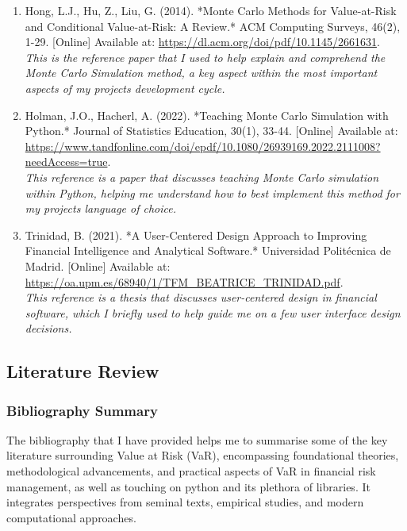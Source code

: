 \documentclass{article}
\begin{document}
\begin{small}
\begin{enumerate}
  \item\label{ref16} Hong, L.J., Hu, Z., Liu, G. (2014). *Monte Carlo Methods for Value-at-Risk and Conditional Value-at-Risk: A Review.* ACM Computing Surveys, 46(2), 1-29. [Online] Available at: \url{https://dl.acm.org/doi/pdf/10.1145/2661631}.
  \\\textit{This is the reference paper that I used to help explain and comprehend the Monte Carlo Simulation method, a key aspect within the most important aspects of my projects development cycle.}

  \item\label{ref17} Holman, J.O., Hacherl, A. (2022). *Teaching Monte Carlo Simulation with Python.* Journal of Statistics Education, 30(1), 33-44. [Online] Available at: \url{https://www.tandfonline.com/doi/epdf/10.1080/26939169.2022.2111008?needAccess=true}.
  \\\textit{This reference is a paper that discusses teaching Monte Carlo simulation within Python, helping me understand how to best implement this method for my projects language of choice.}

  \item\label{ref18} Trinidad, B. (2021). *A User-Centered Design Approach to Improving Financial Intelligence and Analytical Software.* Universidad Politécnica de Madrid. [Online] Available at: \url{https://oa.upm.es/68940/1/TFM_BEATRICE_TRINIDAD.pdf}.
  \\\textit{This reference is a thesis that discusses user-centered design in financial software, which I briefly used to help guide me on a few user interface design decisions.}
\end{enumerate}
\end{small}

\subsection{Literature Review}

\subsubsection{Bibliography Summary}

The bibliography that I have provided helps me to summarise some of the key literature surrounding Value at Risk (VaR), encompassing foundational theories, methodological advancements, and practical aspects of VaR in financial risk management, as well as touching on python and its plethora of libraries. It integrates perspectives from seminal texts, empirical studies, and modern computational approaches.\\\vspace{0.3cm}
\end{document}
